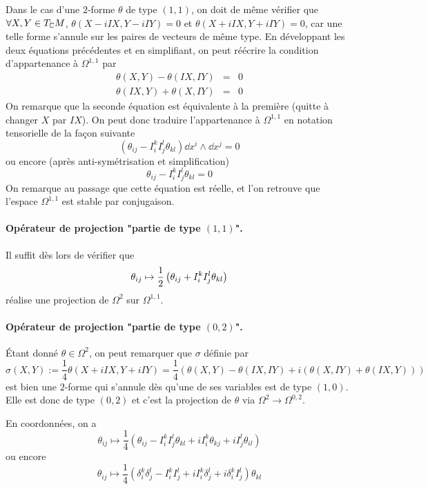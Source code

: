 \documentclass[12pt,draft]{article}
\begin{document}
Dans le cas d'une $2$-forme $\theta$ de type $(1,1)$, on doit de même vérifier que $\forall X,Y \in T_{\mathbb{C}} M$, $\theta(X-iIX,Y-iIY) = 0$ et $\theta(X+iIX,Y+iIY) = 0$, car une telle forme s'annule sur les paires de vecteurs de même type. En développant les deux équations précédentes et en simplifiant, on peut réécrire la condition d'appartenance à $\Omega^{1,1}$ par
\begin{eqnarray*}
\theta(X,Y)-\theta(IX,IY) &=& 0\\
\theta(IX,Y) + \theta(X,IY) & = & 0
\end{eqnarray*}
On remarque que la seconde équation est équivalente à la première (quitte à changer $X$ par $IX$). On peut donc traduire l'appartenance à $\Omega^{1,1}$ en notation tensorielle de la façon suivante
\[
\left(\theta_{ij}-I_i^kI_j^l\theta_{kl}\right) \dd x^i \wedge \dd x^j = 0
\]
ou encore (après anti-symétrisation et simplification)
\[
\theta_{ij}-I_i^kI_j^l\theta_{kl} = 0
\]
On remarque au passage que cette équation est réelle, et l'on retrouve que l'espace $\Omega^{1,1}$ est stable par conjugaison.

\paragraph*{Opérateur de projection "partie de type $(1,1)$".}Il suffit dès lors de vérifier que
\[
\theta_{ij} \mapsto \operatorname{\frac{1}{2}} \left(\theta_{ij} + I_i^kI_j^l\theta_{kl}\right)
\]
réalise une projection de $\Omega^2$ sur $\Omega^{1,1}$.

\paragraph*{Opérateur de projection "partie de type $(0,2)$".} Étant donné $\theta \in \Omega^2$, on peut remarquer que $\sigma$ définie par
\[
 \sigma(X,Y) :=\dfrac{1}{4}\theta\left(X+iIX,Y+iIY\right) = \dfrac{1}{4}\left(
 \theta(X,Y) - \theta(IX,IY) + i\left(\theta(X,IY) + \theta(IX,Y) \right)
 \right)
\]
est bien une $2$-forme qui s'annule dès qu'une de ses variables est de type $(1,0)$. Elle est donc de type $(0,2)$ et c'est la projection de $\theta$ via $\Omega^2 \rightarrow \Omega^{0,2}$.

En coordonnées, on a
\[
\theta_{ij} \mapsto \dfrac{1}{4}\left( \theta_{ij} - I_i^k I_j^l \theta_{kl} + iI_i^k \theta_{kj} + i I_j^l\theta_{il}\right)
\]
ou encore
\[
\theta_{ij} \mapsto \dfrac{1}{4}\left( \delta_i^k\delta_j^l - I_i^k I_j^l  + iI_i^k\delta_j^l + i \delta_i^kI_j^l\right)\theta_{kl}
\]
\end{document}
